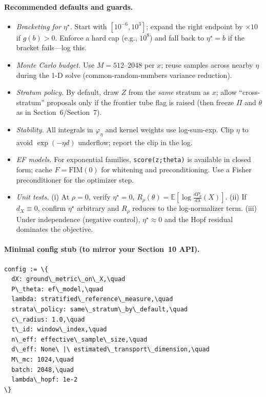 \paragraph{Recommended defaults and guards.}
\begin{itemize}[leftmargin=*]
\item \emph{Bracketing for \(\eta^\star\).} Start with \([10^{-6},10^3]\); expand the right endpoint by \(\times 10\) if \(g(b)>0\). Enforce a hard cap (e.g., \(10^8\)) and fall back to \(\eta^\star=b\) if the bracket fails---log this.
\item \emph{Monte Carlo budget.} Use \(M=512\)--\(2048\) per \(x\); reuse samples across nearby \(\eta\) during the 1-D solve (common-random-numbers variance reduction).
\item \emph{Stratum policy.} By default, draw \(Z\) from the \emph{same} stratum as \(x\); allow ``cross-stratum'' proposals only if the frontier tube flag is raised (then freeze \(\Pi\) and \(\theta\) as in Section~6/Section~7).
\item \emph{Stability.} All integrals in \(\varphi_\eta\) and kernel weights use log-sum-exp. Clip \(\eta\) to avoid \(\exp(-\eta d)\) underflow; report the clip in the log.
\item \emph{EF models.} For exponential families, \texttt{score(z;theta)} is available in closed form; cache \(F=\mathrm{FIM}(0)\) for whitening and preconditioning. Use a Fisher preconditioner for the optimizer step.
\item \emph{Unit tests.} (i) At \(\rho=0\), verify \(\eta^\star\!=\!0\), \(R_\rho(\theta)=\mathbb E[\log \frac{dP_\theta}{d\lambda}(X)]\). (ii) If \(d_X\equiv 0\), confirm \(\eta^\star\) arbitrary and \(R_\rho\) reduces to the log-normalizer term. (iii) Under independence (negative control), \(\eta^\star\approx 0\) and the Hopf residual dominates the objective.
\end{itemize}

\paragraph{Minimal config stub (to mirror your Section~10 API).}
\begin{lstlisting}
config := \{
  dX: ground\_metric\_on\_X,\quad
  P\_theta: ef\_model,\quad
  lambda: stratified\_reference\_measure,\quad
  strata\_policy: same\_stratum\_by\_default,\quad
  c\_radius: 1.0,\quad
  t\_id: window\_index,\quad
  n\_eff: effective\_sample\_size,\quad
  d\_eff: None\ |\ estimated\_transport\_dimension,\quad
  M\_mc: 1024,\quad
  batch: 2048,\quad
  lambda\_hopf: 1e-2
\}
\end{lstlisting}


